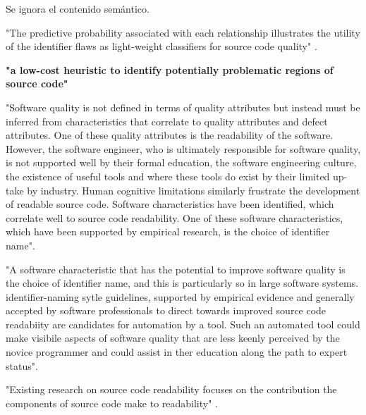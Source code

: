 Se ignora el contenido semántico.

"The predictive probability associated with each relationship illustrates the utility
of the identifier flaws as light-weight classifiers for source code quality"
\cite{ButlerWemelingerYu10}.

\textbf{"a low-cost heuristic to identify potentially problematic regions of source code"}

"Software quality is not defined in terms of quality attributes but instead must be
inferred from characteristics that correlate to quality attributes and defect attributes.
One of these quality attributes is the readability of the software.
However, the software engineer, who is ultimately responsible for software quality,
is not supported well by their formal education, the software engineering culture, the
existence of useful tools and where these tools do exist by their limited up-take by industry.
Human cognitive limitations similarly frustrate the development of readable source code.
Software characteristics have been identified, which correlate well to source code readability.
One of these software characteristics, which have been supported by empirical research,
is the choice of identifier name".\cite{Relf04}

"A software characteristic that has the potential to improve software quality is the choice of
identifier name, and this is particularly so in large software systems.
identifier-naming sytle guidelines, supported by empirical evidence and generally accepted by
software professionals to direct towards improved source code readabiity are candidates for
automation by a tool.
Such an automated tool could make visibile aspects of software quality that are less keenly
perceived by the novice programmer and could assist in ther education along the path to
expert status"\cite{Relf04}.

"Existing research on source code readability focuses on the contribution the
components of source code make to readability" \cite{Buse2008}.
